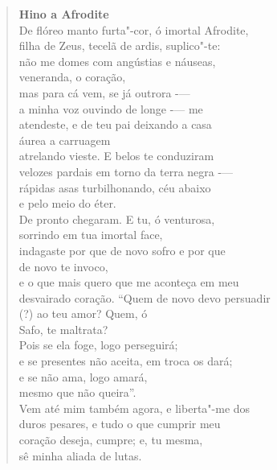 \documentclass[12pt]{extarticle}
\begin{document}
\begin{enumerate}
\begin{verse}
\textbf{Hino a Afrodite}\\
De flóreo manto furta"-cor, ó imortal Afrodite,\\
filha de Zeus, tecelã de ardis, suplico"-te:\\
não me domes com angústias e náuseas,\\
veneranda, o coração,\\
\medskip
mas para cá vem, se já outrora -—\\
a minha voz ouvindo de longe -— me \\
atendeste, e de teu pai deixando a casa\\
áurea a carruagem\\
\medskip
atrelando vieste. E belos te conduziram\\
velozes pardais em torno da terra negra -—\\
rápidas asas turbilhonando, céu abaixo\\
e pelo meio do éter.\\
\medskip
De pronto chegaram. E tu, ó venturosa,\\
sorrindo em tua imortal face,\\
indagaste por que de novo sofro e por que\\
de novo te invoco,\\
\medskip
e o que mais quero que me aconteça em meu \\
desvairado coração. ``Quem de novo devo persuadir\\
(?) ao teu amor? Quem, ó\\
Safo, te maltrata?\\
\medskip
Pois se ela foge, logo perseguirá;\\
e se presentes não aceita, em troca os dará;\\
e se não ama, logo amará,\\
mesmo que não queira''.\\
\medskip
Vem até mim também agora, e liberta"-me dos\\
duros pesares, e tudo o que cumprir meu\\
coração deseja, cumpre; e, tu mesma,\\
sê minha aliada de lutas.\\
\end{verse}



\end{enumerate}
\end{document}
